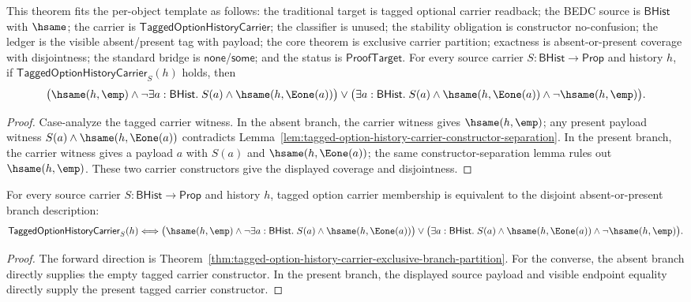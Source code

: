 \begin{theorem}
\label{thm:tagged-option-history-carrier-exclusive-branch-partition}
This theorem fits the per-object template as follows: the traditional target is
tagged optional carrier readback; the BEDC source is $\mathsf{BHist}$ with
$\hsame$; the carrier is $\mathsf{TaggedOptionHistoryCarrier}$; the classifier
is unused; the stability obligation is constructor no-confusion; the ledger is
the visible absent/present tag with payload; the core theorem is exclusive
carrier partition; exactness is absent-or-present coverage with disjointness;
the standard bridge is $\mathsf{none}$/$\mathsf{some}$; and the status is
$\mathsf{ProofTarget}$. For every source carrier
$S:\mathsf{BHist}\to\mathsf{Prop}$ and history $h$, if
$\mathsf{TaggedOptionHistoryCarrier}_S(h)$ holds, then
$$
\bigl(\hsame(h,\emp)\land
\neg\exists a:\mathsf{BHist}.\; S(a)\land\hsame(h,\Eone(a))\bigr)
\lor
\bigl(\exists a:\mathsf{BHist}.\;
S(a)\land\hsame(h,\Eone(a))\land\neg\hsame(h,\emp)\bigr).
$$
\end{theorem}
\begin{proof}
Case-analyze the tagged carrier witness. In the absent branch, the carrier
witness gives $\hsame(h,\emp)$; any present payload witness
$S(a)\land\hsame(h,\Eone(a))$ contradicts
Lemma~\ref{lem:tagged-option-history-carrier-constructor-separation}. In the
present branch, the carrier witness gives a payload $a$ with $S(a)$ and
$\hsame(h,\Eone(a))$; the same constructor-separation lemma rules out
$\hsame(h,\emp)$. These two carrier constructors give the displayed coverage
and disjointness.
\end{proof}

\begin{theorem}
\label{thm:tagged-option-history-carrier-exclusive-branch-iff}
For every source carrier $S:\mathsf{BHist}\to\mathsf{Prop}$ and history $h$,
tagged option carrier membership is equivalent to the disjoint absent-or-present
branch description:
$$
\mathsf{TaggedOptionHistoryCarrier}_S(h)
\Longleftrightarrow
\bigl(\hsame(h,\emp)\land
\neg\exists a:\mathsf{BHist}.\; S(a)\land\hsame(h,\Eone(a))\bigr)
\lor
\bigl(\exists a:\mathsf{BHist}.\;
S(a)\land\hsame(h,\Eone(a))\land\neg\hsame(h,\emp)\bigr).
$$
\end{theorem}
\begin{proof}
The forward direction is Theorem~\ref{thm:tagged-option-history-carrier-exclusive-branch-partition}.
For the converse, the absent branch directly supplies the empty tagged carrier
constructor. In the present branch, the displayed source payload and visible
endpoint equality directly supply the present tagged carrier constructor.
\end{proof}

